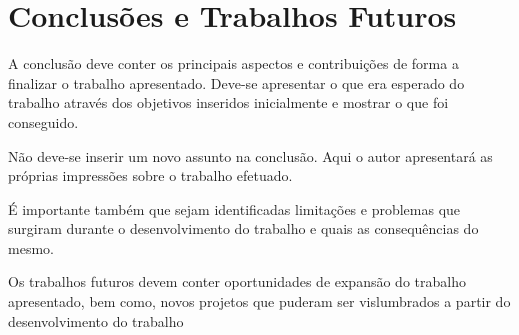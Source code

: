 \chapter{Conclusões e Trabalhos Futuros}

A conclusão deve conter os principais aspectos e contribuições de forma a
finalizar o trabalho apresentado. Deve-se apresentar o que era esperado do
trabalho através dos objetivos inseridos inicialmente e mostrar o que foi
conseguido.

Não deve-se inserir um novo assunto na conclusão. Aqui o autor apresentará as
próprias impressões sobre o trabalho efetuado.

É importante também que sejam identificadas limitações e problemas que surgiram
durante o desenvolvimento do trabalho e quais as consequências do mesmo.

Os trabalhos futuros devem conter oportunidades de expansão do trabalho
apresentado, bem como, novos projetos que puderam ser vislumbrados a partir do
desenvolvimento do trabalho
